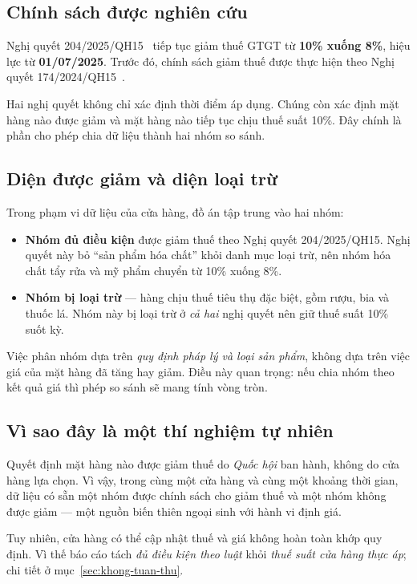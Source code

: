 \documentclass[11pt]{article}
\begin{document}
\subsection{Chính sách được nghiên cứu}

Nghị quyết 204/2025/QH15~\cite{nq204} tiếp tục giảm thuế GTGT từ \textbf{10\% xuống 8\%}, hiệu lực
từ \textbf{01/07/2025}. Trước đó, chính sách giảm thuế được thực hiện theo Nghị quyết
174/2024/QH15~\cite{nq174}.

Hai nghị quyết không chỉ xác định thời điểm áp dụng. Chúng còn xác định mặt hàng nào được giảm và
mặt hàng nào tiếp tục chịu thuế suất 10\%. Đây chính là phần cho phép chia dữ liệu thành hai nhóm
so sánh.

\subsection{Diện được giảm và diện loại trừ}

Trong phạm vi dữ liệu của cửa hàng, đồ án tập trung vào hai nhóm:

\begin{itemize}
  \item \textbf{Nhóm đủ điều kiện} được giảm thuế theo Nghị quyết 204/2025/QH15. Nghị quyết này bỏ
  ``sản phẩm hóa chất'' khỏi danh mục loại trừ, nên nhóm hóa chất tẩy rửa và mỹ phẩm chuyển từ 10\%
  xuống 8\%.
  \item \textbf{Nhóm bị loại trừ} --- hàng chịu thuế tiêu thụ đặc biệt, gồm rượu, bia và thuốc lá.
  Nhóm này bị loại trừ ở \emph{cả hai} nghị quyết nên giữ thuế suất 10\% suốt kỳ.
\end{itemize}

Việc phân nhóm dựa trên \emph{quy định pháp lý và loại sản phẩm}, không dựa trên việc giá của mặt
hàng đã tăng hay giảm. Điều này quan trọng: nếu chia nhóm theo kết quả giá thì phép so sánh sẽ
mang tính vòng tròn.

\subsection{Vì sao đây là một thí nghiệm tự nhiên}

Quyết định mặt hàng nào được giảm thuế do \emph{Quốc hội} ban hành, không do cửa hàng lựa chọn.
Vì vậy, trong cùng một cửa hàng và cùng một khoảng thời gian, dữ liệu có sẵn một nhóm được chính
sách cho giảm thuế và một nhóm không được giảm --- một nguồn biến thiên ngoại sinh với hành vi
định giá.

Tuy nhiên, cửa hàng có thể cập nhật thuế và giá không hoàn toàn khớp quy định. Vì thế báo cáo tách
\emph{đủ điều kiện theo luật} khỏi \emph{thuế suất cửa hàng thực áp}; chi tiết ở
mục~\ref{sec:khong-tuan-thu}.
\end{document}
